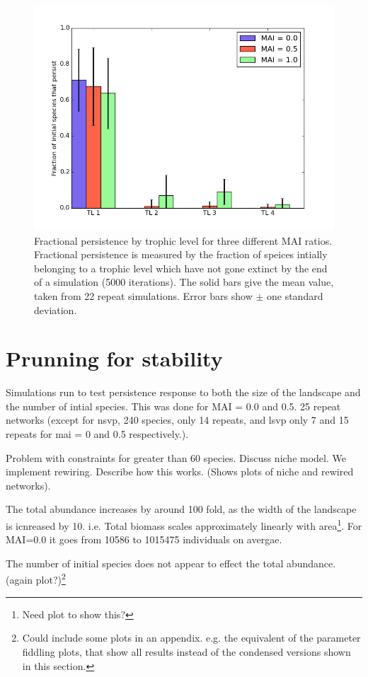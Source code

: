 \begin{figure}
	\centering
	\includegraphics[width=0.8\linewidth]{"figures/hist_species_per_tl_zeroIR"}
	\caption{Fractional persistence by trophic level for three different MAI ratios. Fractional persistence is measured by the fraction of speices intially belonging to a trophic level which have not gone extinct by the end of a simulation (5000 iterations). The solid bars give the mean value, taken  from 22 repeat simulations. Error bars show $\pm$ one standard deviation.}
	\label{fig:mvp_hist_zeroIR}
\end{figure}

\section{Prunning for stability}

Simulations run to test persistence response to both the size of the landscape and the number of intial species. This was done for MAI = 0.0 and 0.5. 25 repeat networks (except for nsvp, 240 species, only 14 repeats, and lsvp only 7 and 15 repeats for mai = 0 and 0.5 respectively.). 

Problem with constraints for greater than 60 species. Discuss niche model. We implement rewiring. Describe how this works. (Shows plots of niche and rewired networks).  

The total abundance increases by around 100 fold, as the width of the landscape is icnreased by 10. i.e. Total biomass scales approximately linearly with area\footnote{Need plot to show this?}. For MAI=0.0 it goes from 10586 to 1015475 individuals on avergae. 

The number of initial species does not appear to effect the total abundance. (again plot?)\footnote{Could include some plots in an appendix. e.g. the equivalent of the parameter fiddling plots, that show all results instead of the condensed versions shown in this section.} 


